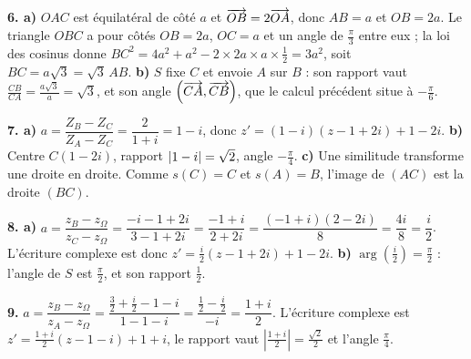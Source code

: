 \begin{corrige}[annales]
\textbf{6. a)} $OAC$ est équilatéral de côté $a$ et $\overrightarrow{OB} = 2\overrightarrow{OA}$,
donc $AB = a$ et $OB = 2a$. Le triangle $OBC$ a pour côtés $OB = 2a$,
$OC = a$ et un angle de $\frac{\pi}{3}$ entre eux ; la loi des cosinus donne
$BC^{2} = 4a^{2}+a^{2}-2 \times 2a \times a \times \frac12 = 3a^{2}$, soit
$BC = a\sqrt3 = \sqrt3\,AB$.
\textbf{b)} $S$ fixe $C$ et envoie $A$ sur $B$ : son rapport vaut
$\frac{CB}{CA} = \frac{a\sqrt3}{a} = \sqrt3$, et son angle
$\left(\overrightarrow{CA},\overrightarrow{CB}\right)$, que le calcul précédent situe à
$-\frac{\pi}{6}$.

\textbf{7. a)} $a = \dfrac{Z_{B}-Z_{C}}{Z_{A}-Z_{C}} = \dfrac{2}{1+i} = 1-i$,
donc $z' = (1-i)(z-1+2i)+1-2i$.
\textbf{b)} Centre $C(1-2i)$, rapport $\left|1-i\right| = \sqrt2$, angle
$-\frac{\pi}{4}$.
\textbf{c)} Une similitude transforme une droite en droite. Comme
$s(C) = C$ et $s(A) = B$, l'image de $(AC)$ est la droite $(BC)$.

\textbf{8. a)} $a = \dfrac{z_{B}-z_{\Omega}}{z_{C}-z_{\Omega}}
= \dfrac{-i-1+2i}{3-1+2i} = \dfrac{-1+i}{2+2i}
= \dfrac{(-1+i)(2-2i)}{8} = \dfrac{4i}{8} = \dfrac i2$. L'écriture complexe
est donc $z' = \frac i2\left(z-1+2i\right)+1-2i$.
\textbf{b)} $\arg\!\left(\frac i2\right) = \frac{\pi}{2}$ : l'angle de $S$ est
$\frac{\pi}{2}$, et son rapport $\frac12$.

\textbf{9.} $a = \dfrac{z_{B}-z_{\Omega}}{z_{A}-z_{\Omega}}
= \dfrac{\frac32+\frac i2-1-i}{1-1-i}
= \dfrac{\frac12-\frac i2}{-i} = \dfrac{1+i}{2}$. L'écriture complexe est
$z' = \frac{1+i}{2}\left(z-1-i\right)+1+i$, le rapport vaut
$\left|\frac{1+i}{2}\right| = \frac{\sqrt2}{2}$ et l'angle
$\frac{\pi}{4}$.
\end{corrige}

